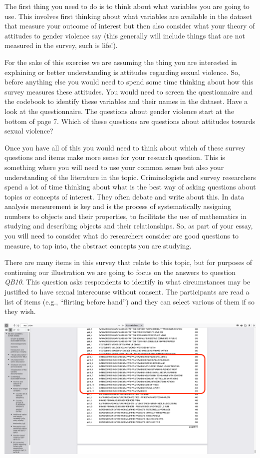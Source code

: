 \documentclass[
]{book}
\begin{document}
The first thing you need to do is to think about what variables you are going to use. This involves first thinking about what variables are available in the dataset that measure your outcome of interest but then also consider what your theory of attitudes to gender violence say (this generally will include things that are not measured in the survey, such is life!).

For the sake of this exercise we are assuming the thing you are interested in explaining or better understanding is attitudes regarding sexual violence. So, before anything else you would need to spend some time thinking about how this survey measures these attitudes. You would need to screen the questionnaire and the codebook to identify these variables and their names in the dataset. Have a look at the questionnaire. The questions about gender violence start at the bottom of page 7. Which of these questions are questions about attitudes towards sexual violence?

Once you have all of this you would need to think about which of these survey questions and items make more sense for your research question. This is something where you will need to use your common sense but also your understanding of the literature in the topic. Criminologists and survey researchers spend a lot of time thinking about what is the best way of asking questions about topics or concepts of interest. They often debate and write about this. In data analysis measurement is key and is the process of systematically assigning numbers to objects and their properties, to facilitate the use of mathematics in studying and describing objects and their relationships. So, as part of your essay, you will need to consider what do researchers consider are good questions to measure, to tap into, the abstract concepts you are studying.

There are many items in this survey that relate to this topic, but for purposes of continuing our illustration we are going to focus on the answers to question \emph{QB10}. This question asks respondents to identify in what circumstances may be justified to have sexual intercourse without consent. The participants are read a list of items (e.g., ``flirting before hand'') and they can select various of them if so they wish.

\includegraphics{imgs/qb10.PNG}
\end{document}
